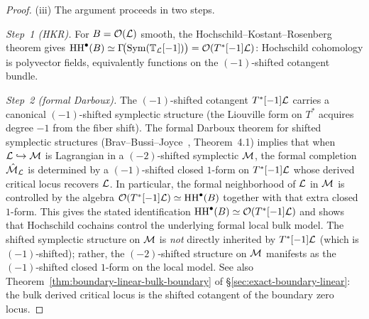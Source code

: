 \begin{proof}
(iii) The argument proceeds in two steps.

\emph{Step~1 (HKR).}
For $B = \mathcal O(\mathcal L)$ smooth, the Hochschild--Kostant--Rosenberg
theorem gives
$\operatorname{HH}^\bullet(B) \simeq \Gamma\!\bigl(\operatorname{Sym}(\mathbb{T}_\mathcal L[-1])\bigr)
= \mathcal O(T^*[-1]\mathcal L)$:
Hochschild cohomology is polyvector fields, equivalently functions
on the $(-1)$-shifted cotangent bundle.

\emph{Step~2 (formal Darboux).}
The $(-1)$-shifted cotangent $T^*[-1]\mathcal L$ carries a canonical
$(-1)$-shifted symplectic structure (the Liouville form on $T^*$
acquires degree $-1$ from the fiber shift). The formal Darboux
theorem for shifted symplectic structures
(Brav--Bussi--Joyce~\cite{BBJ19}, Theorem~4.1) implies that
when $\mathcal L \hookrightarrow \mathcal M$ is Lagrangian in a
$(-2)$-shifted symplectic $\mathcal M$, the formal completion
$\hat{\mathcal M}_\mathcal L$ is determined by a $(-1)$-shifted closed
$1$-form on $T^*[-1]\mathcal L$ whose derived critical locus recovers
$\mathcal L$. In particular, the formal neighborhood of $\mathcal L$ in $\mathcal M$
is controlled by the algebra $\mathcal O(T^*[-1]\mathcal L)\simeq
\operatorname{HH}^\bullet(B)$ together with that extra closed $1$-form.
This gives the stated identification $\operatorname{HH}^\bullet(B) \simeq
\mathcal O(T^*[-1]\mathcal L)$ and shows that Hochschild cochains control the
underlying formal local bulk model. The shifted symplectic structure on
$\mathcal M$ is \emph{not} directly inherited by $T^*[-1]\mathcal L$ (which is
$(-1)$-shifted); rather, the $(-2)$-shifted structure on $\mathcal M$
manifests as the $(-1)$-shifted closed $1$-form on the local model.
See also Theorem~\ref{thm:boundary-linear-bulk-boundary} of
\S\ref{sec:exact-boundary-linear}: the bulk derived critical locus
is the shifted cotangent of the boundary zero locus.
\end{proof}

